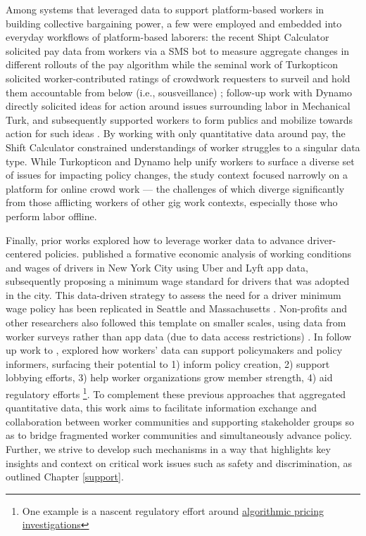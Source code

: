 {Among systems that leveraged data to support platform-based workers in building collective bargaining power, a few were employed and embedded into everyday workflows of platform-based laborers:}
the recent Shipt Calculator {solicited pay data from workers via a SMS bot to measure aggregate changes in different rollouts of the pay algorithm} \cite{calacci2022bargaining} while {the seminal work of} Turkopticon {solicited worker-contributed ratings of crowdwork requesters to surveil and hold them accountable from below (i.e., sousveillance)} \cite{turkopticon}; follow-up work with Dynamo {directly solicited ideas for action around issues surrounding labor in Mechanical Turk, and subsequently supported workers to form publics and mobilize towards action for such ideas} \cite{dynamo}{. By working with only quantitative data around pay, the Shift Calculator constrained understandings of worker struggles to a singular data type. While Turkopticon and Dynamo help unify workers to surface a diverse set of issues for impacting policy changes, the study context focused narrowly on a platform for online crowd work --- the challenges of which diverge significantly from those afflicting workers of other gig work contexts, especially those who perform labor offline.} 

Finally, prior works explored how to leverage worker data to advance driver-centered policies. \citet{parrott2018earnings} published a formative economic analysis {of} working conditions and wages of drivers in New York City {using Uber and Lyft app data}, subsequently proposing a minimum wage standard {for drivers} that was adopted in the city. This data-driven strategy to assess the need for a driver minimum wage policy has been replicated in Seattle \cite{reich2020minimum} and Massachusetts \cite{jacobs2021massachusetts}. Non-profits and other researchers also followed this template on smaller scales, {using} data from worker surveys {rather than app data (due to data access restrictions)} \cite{Leverage_Dalal_2022, McCullough_Dolber_Scoggins_Muna_Treuhaft_2022, McCullough_Dolber_2021, washington2019delivering}. 
In follow up work to \cite{zhang2023stakeholder}, \citet{zhang2024data} explored how workers' data can support policymakers and policy informers, surfacing the{ir} potential to 1) inform policy creation, 2) support lobbying efforts, 3) help worker organizations grow member strength, 4) aid regulatory efforts \footnote{One example is a nascent regulatory effort around \href{https://www.ftc.gov/business-guidance/blog/2024/03/price-fixing-algorithm-still-price-fixing}{algorithmic pricing investigations}}.
To complement these previous approaches that aggregated quantitative data, this work aims to facilitate information exchange and collaboration between worker communities and supporting stakeholder groups so as to bridge fragmented worker communities and simultaneously advance policy. Further, we strive to develop such mechanisms in a way that highlights key insights and context on critical work issues such as safety and discrimination, as outlined Chapter \ref{support}.

